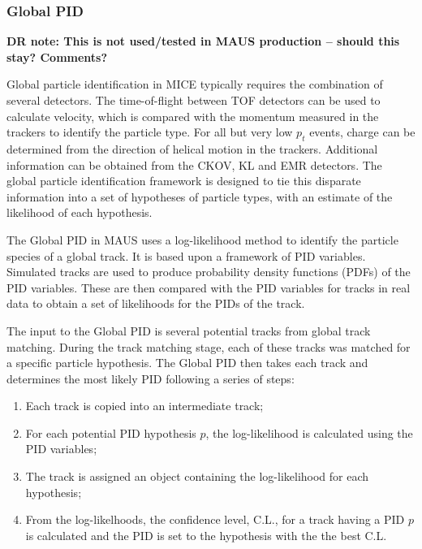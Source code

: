 \documentclass{JINST}
\begin{document}


\subsubsection{Global PID} 

{\bf DR note: This is not used/tested in MAUS production -- should this stay? Comments?}

Global particle identification in MICE typically requires the combination of several detectors. The time-of-flight between TOF detectors can be used to calculate velocity, which is compared 
with the momentum measured in the trackers to identify the particle type. For all but very low $p_t$ events, charge can be determined from the direction of helical motion in the trackers. Additional information can be obtained from the CKOV, KL and EMR detectors. The global particle identification framework is designed to tie this disparate information into a set of hypotheses of particle types, with an estimate of the likelihood of each hypothesis. 


The Global PID in MAUS uses a log-likelihood method to identify the particle species of a global track. It is based upon a framework of PID variables. Simulated tracks are used to produce probability density functions (PDFs) of the PID variables. These are then compared with the PID variables for tracks in real data to obtain a set of likelihoods for the PIDs of the track.

The input to the Global PID is several potential tracks from global track matching. During the track matching stage, each of these tracks was matched for a specific particle hypothesis. The Global PID then takes each track and determines the most likely PID following a series of steps:

\begin{enumerate}
\item Each track is copied into an intermediate track;
\item For each potential PID hypothesis $p$, the log-likelihood is calculated using the PID variables;
\item The track is assigned an object containing the log-likelihood for each hypothesis;
\item From the log-likelhoods, the confidence level, C.L., for a track having a PID $p$ is calculated and the PID is set to the hypothesis with the the best C.L.
\end{enumerate}
\end{document}

